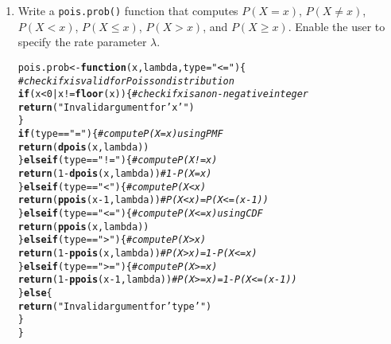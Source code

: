 \documentclass{article}\usepackage[]{graphicx}\usepackage[]{xcolor}
\makeatletter
\newcommand{\hlnum}[1]{\textcolor[rgb]{0.686,0.059,0.569}{#1}}%
\newcommand{\hlsng}[1]{\textcolor[rgb]{0.192,0.494,0.8}{#1}}%
\newcommand{\hlcom}[1]{\textcolor[rgb]{0.678,0.584,0.686}{\textit{#1}}}%
\newcommand{\hlopt}[1]{\textcolor[rgb]{0,0,0}{#1}}%
\newcommand{\hldef}[1]{\textcolor[rgb]{0.345,0.345,0.345}{#1}}%
\newcommand{\hlkwa}[1]{\textcolor[rgb]{0.161,0.373,0.58}{\textbf{#1}}}%
\newcommand{\hlkwb}[1]{\textcolor[rgb]{0.69,0.353,0.396}{#1}}%
\newcommand{\hlkwc}[1]{\textcolor[rgb]{0.333,0.667,0.333}{#1}}%
\newcommand{\hlkwd}[1]{\textcolor[rgb]{0.737,0.353,0.396}{\textbf{#1}}}%
\newenvironment{kframe}{%
 \def\at@end@of@kframe{}%
 \ifinner\ifhmode%
  \def\at@end@of@kframe{\end{minipage}}%
  \begin{minipage}{\columnwidth}%
 \fi\fi%
 \def\FrameCommand##1{\hskip\@totalleftmargin \hskip-\fboxsep
 \colorbox{shadecolor}{##1}\hskip-\fboxsep
     \hskip-\linewidth \hskip-\@totalleftmargin \hskip\columnwidth}%
 \MakeFramed {\advance\hsize-\width
   \@totalleftmargin\z@ \linewidth\hsize
   \@setminipage}}%
 {\par\unskip\endMakeFramed%
 \at@end@of@kframe}
\newenvironment{knitrout}{}{} %
\makeatother
\begin{document}
  \begin{enumerate}
    \item Write a \texttt{pois.prob()} function that computes $P(X=x)$, 
    $P(X \neq x)$, $P(X<x)$, $P(X \leq x)$, $P(X > x)$, and $P(X \geq x).$ Enable the user to specify the rate parameter $\lambda$.
\begin{knitrout}\scriptsize
{}\color{fgcolor}\begin{kframe}
\begin{alltt}
\hldef{pois.prob} \hlkwb{<-} \hlkwa{function}\hldef{(}\hlkwc{x}\hldef{,} \hlkwc{lambda}\hldef{,} \hlkwc{type}\hldef{=}\hlsng{"<="}\hldef{)\{}
  \hlcom{#check if x is valid for Poisson distribution}
  \hlkwa{if} \hldef{(x}\hlopt{<}\hlnum{0} \hlopt{|} \hldef{x} \hlopt{!=} \hlkwd{floor}\hldef{(x))\{} \hlcom{#check if x is a non-negative integer}
    \hlkwd{return}\hldef{(}\hlsng{"Invalid argument for 'x'"}\hldef{)}
  \hldef{\}}
  \hlkwa{if} \hldef{(type} \hlopt{==} \hlsng{"="}\hldef{)\{} \hlcom{#compute P(X=x) using PMF}
    \hlkwd{return}\hldef{(}\hlkwd{dpois}\hldef{(x, lambda))}
  \hldef{\}}\hlkwa{else if}\hldef{(type} \hlopt{==} \hlsng{"!="}\hldef{)\{}  \hlcom{#compute P(X!=x)}
    \hlkwd{return}\hldef{(}\hlnum{1} \hlopt{-} \hlkwd{dpois}\hldef{(x, lambda))} \hlcom{# 1 - P(X=x)}
  \hldef{\}}\hlkwa{else if}\hldef{(type} \hlopt{==} \hlsng{"<"}\hldef{)\{}  \hlcom{#compute P(X<x) }
    \hlkwd{return}\hldef{(}\hlkwd{ppois}\hldef{(x} \hlopt{-}\hlnum{1}\hldef{, lambda))} \hlcom{# P(X<x) = P(X<=(x-1))}
  \hldef{\}}\hlkwa{else if}\hldef{(type} \hlopt{==} \hlsng{"<="}\hldef{)\{} \hlcom{#compute P(X<=x) using CDF}
    \hlkwd{return}\hldef{(}\hlkwd{ppois}\hldef{(x, lambda))}
  \hldef{\}}\hlkwa{else if}\hldef{(type} \hlopt{==} \hlsng{">"}\hldef{)\{}  \hlcom{#compute P(X>x)}
    \hlkwd{return}\hldef{(}\hlnum{1} \hlopt{-} \hlkwd{ppois}\hldef{(x,lambda))} \hlcom{# P(X>x) = 1 - P(X<=x)}
  \hldef{\}}\hlkwa{else if} \hldef{(type} \hlopt{==} \hlsng{">="}\hldef{)\{}  \hlcom{#compute P(X>=x) }
    \hlkwd{return}\hldef{(}\hlnum{1} \hlopt{-} \hlkwd{ppois}\hldef{(x} \hlopt{-}\hlnum{1}\hldef{,lambda))} \hlcom{# P(X>=x) = 1 - P(X<=(x-1))}
  \hldef{\}}\hlkwa{else}\hldef{\{}
    \hlkwd{return}\hldef{(}\hlsng{"Invalid argument for 'type'"}\hldef{)}
  \hldef{\}}
\hldef{\}}
\end{alltt}
\end{kframe}

\end{knitrout}
\end{enumerate}
\end{document}
